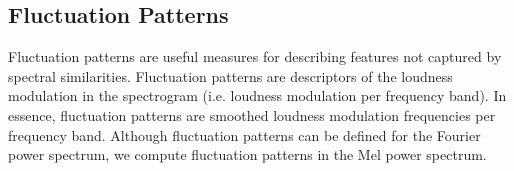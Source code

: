 \documentclass[12pt]{article}
\begin{document}
%
%
%
%
%
%
%
%

\subsection{Fluctuation Patterns}

Fluctuation patterns are useful measures for describing features not captured by spectral similarities.  Fluctuation patterns are descriptors of the loudness modulation in the spectrogram (i.e. loudness modulation per frequency band).  In essence, fluctuation patterns are smoothed loudness modulation frequencies per frequency band.  Although fluctuation patterns can be defined for the Fourier power spectrum, we compute fluctuation patterns in the Mel power spectrum.\\
\end{document}

